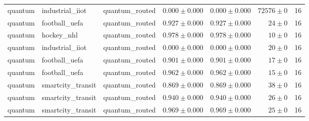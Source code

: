 \begin{table}[htbp]
\begin{tabular}{l l l r r r r}
quantum & industrial\_iiot & quantum\_routed & $0.000\pm0.000$ & $0.000\pm0.000$ & $72576\pm0$ & 16 \\
quantum & football\_uefa & quantum\_routed & $0.927\pm0.000$ & $0.927\pm0.000$ & $24\pm0$ & 16 \\
quantum & hockey\_nhl & quantum\_routed & $0.978\pm0.000$ & $0.978\pm0.000$ & $10\pm0$ & 16 \\
quantum & industrial\_iiot & quantum\_routed & $0.000\pm0.000$ & $0.000\pm0.000$ & $20\pm0$ & 16 \\
quantum & football\_uefa & quantum\_routed & $0.901\pm0.000$ & $0.901\pm0.000$ & $17\pm0$ & 16 \\
quantum & football\_uefa & quantum\_routed & $0.962\pm0.000$ & $0.962\pm0.000$ & $15\pm0$ & 16 \\
quantum & smartcity\_transit & quantum\_routed & $0.869\pm0.000$ & $0.869\pm0.000$ & $38\pm0$ & 16 \\
quantum & smartcity\_transit & quantum\_routed & $0.940\pm0.000$ & $0.940\pm0.000$ & $26\pm0$ & 16 \\
quantum & smartcity\_transit & quantum\_routed & $0.969\pm0.000$ & $0.969\pm0.000$ & $25\pm0$ & 16 \\
\hline
\end{tabular}
\end{table}
